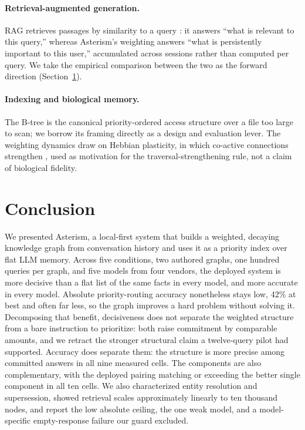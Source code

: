 \documentclass[11pt]{article}
\begin{document}
\paragraph{Retrieval-augmented generation.} RAG retrieves passages by similarity to a query \citep{lewis2020retrieval}: it answers ``what is relevant to this query,'' whereas Asterism's weighting answers ``what is persistently important to this user,'' accumulated across sessions rather than computed per query. We take the empirical comparison between the two as the forward direction (Section~\ref{sec:conclusion}).

\paragraph{Indexing and biological memory.} The B-tree \citep{bayer1972organization} is the canonical priority-ordered access structure over a file too large to scan; we borrow its framing directly as a design and evaluation lever. The weighting dynamics draw on Hebbian plasticity, in which co-active connections strengthen \citep{hebb1949organization,shatz1992developing}, used as motivation for the traversal-strengthening rule, not a claim of biological fidelity.

\section{Conclusion}\label{sec:conclusion}

We presented Asterism, a local-first system that builds a weighted, decaying knowledge graph from conversation history and uses it as a priority index over flat LLM memory. Across five conditions, two authored graphs, one hundred queries per graph, and five models from four vendors, the deployed system is more decisive than a flat list of the same facts in every model, and more accurate in every model. Absolute priority-routing accuracy nonetheless stays low, 42\% at best and often far less, so the graph improves a hard problem without solving it. Decomposing that benefit, decisiveness does not separate the weighted structure from a bare instruction to prioritize: both raise commitment by comparable amounts, and we retract the stronger structural claim a twelve-query pilot had supported. Accuracy does separate them: the structure is more precise among committed answers in all nine measured cells. The components are also complementary, with the deployed pairing matching or exceeding the better single component in all ten cells. We also characterized entity resolution and supersession, showed retrieval scales approximately linearly to ten thousand nodes, and report the low absolute ceiling, the one weak model, and a model-specific empty-response failure our guard excluded.
\end{document}
